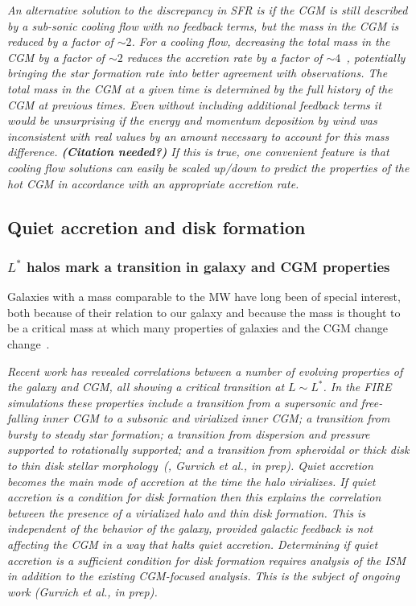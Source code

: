 \documentclass[fleqn,usenatbib]{mnras}
\begin{document}
\textit{
An alternative solution to the discrepancy in SFR is if the CGM is still described by a sub-sonic cooling flow with no feedback terms, but the mass in the CGM is reduced by a factor of  $\sim2$.
For a cooling flow, decreasing the total mass in the CGM by a factor of $\sim 2$ reduces the accretion rate by a factor of $\sim4$~\cite{Stern2019}, potentially bringing the star formation rate into better agreement with observations.
The total mass in the CGM at a given time is determined by the full history of the CGM at previous times.
Even without including additional feedback terms it would be unsurprising if the energy and momentum deposition by wind was inconsistent with real values by an amount necessary to account for this mass difference. \textbf{(Citation needed?)}
If this is true, one convenient feature is that cooling flow solutions can easily be scaled up/down to predict the properties of the hot CGM in accordance with an appropriate accretion rate.
}

\subsection{Quiet accretion and disk formation}
\label{s: disk formation}

\subsubsection{$L^*$ halos mark a transition in galaxy and CGM properties}
\label{s: disk formation -- transition}

Galaxies with a mass comparable to the MW have long been of special interest, both because of their relation to our galaxy and because the mass is thought to be a critical mass at which many properties of galaxies and the CGM change change~\citep[e.g.][]{Fielding2017, Correa2017, Dekel2019a}.

\textit{
Recent work has revealed correlations between a number of evolving properties of the galaxy and CGM, all showing a critical transition at $L \sim L^*$.
In the FIRE simulations these properties include a transition from a supersonic and free-falling inner CGM to a subsonic and virialized inner CGM;
a transition from bursty to steady star formation;
a transition from dispersion and pressure supported to rotationally supported;
and a transition from spheroidal or thick disk to thin disk stellar morphology~(\citealt{El-Badry2018a, Stern2020, Yu2021}, Gurvich et al., in prep).
Quiet accretion becomes the main mode of accretion at the time the halo virializes.
If quiet accretion is a condition for disk formation then this explains the correlation between the presence of a virialized halo and thin disk formation.
This is independent of the behavior of the galaxy, provided galactic feedback is not affecting the CGM in a way that halts quiet accretion.
Determining if quiet accretion is a sufficient condition for disk formation requires analysis of the ISM in addition to the existing CGM-focused analysis.
This is the subject of ongoing work (Gurvich et al., in prep).
}
\end{document}

